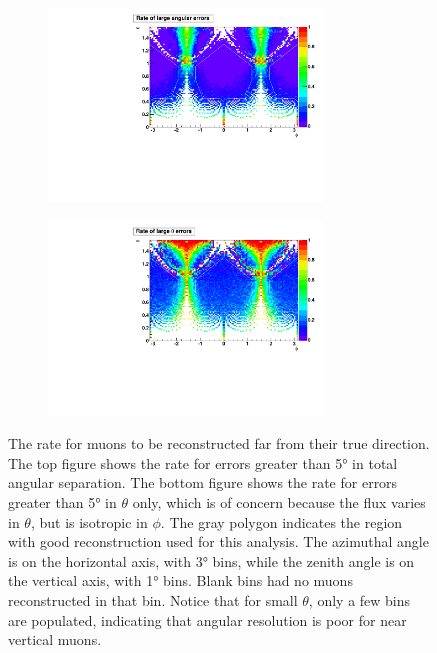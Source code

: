 \documentclass[herrin-thesis.tex]{subfiles}
\begin{document}
 \begin{figure}[htpb]
 \centering
 \begin{subfigure}[b]{1.0\textwidth}
 \centering
 \includegraphics[width=0.8\textwidth]{./plots/muon_misrecon_ang_rate.pdf}
 \end{subfigure}
  \begin{subfigure}[b]{1.0\textwidth}
  \centering
   \includegraphics[width=0.8\textwidth]{./plots/muon_misrecon_theta_rate.pdf}
  \end{subfigure}
 \caption[Rate of poorly reconstructed muons]{The rate for muons to be reconstructed far from their true direction. The top figure shows the rate for  errors greater than \ang{5} in total angular separation. The bottom figure shows the rate for errors greater than \ang{5} in \(\theta\) only, which is of concern because the flux varies in \(\theta\), but is isotropic in \(\phi\). The gray polygon indicates the region with good reconstruction used for this analysis. The azimuthal angle is on the horizontal axis, with \ang{3} bins, while the zenith angle is on the vertical axis, with \ang{1} bins. Blank bins had no muons reconstructed in that bin. Notice that for small \(\theta\), only a few bins are populated, indicating that angular resolution is poor for near vertical muons.}
 \label{fig:muon_misrecon_rate}
 \end{figure}
\end{document}
